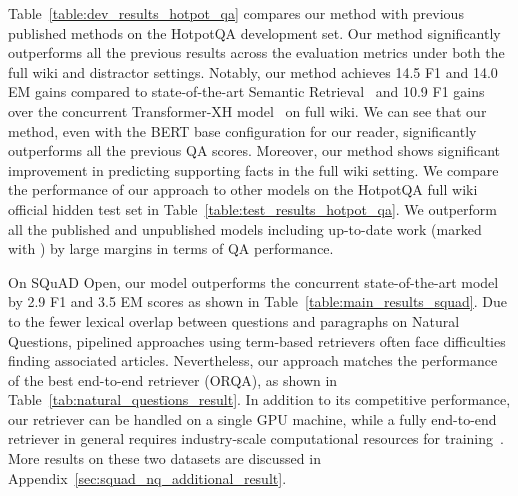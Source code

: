 \documentclass{article} \usepackage{iclr2020_conference,times}
\begin{document}
Table~\ref{table:dev_results_hotpot_qa} compares our method with previous published methods on the HotpotQA development set.
Our method significantly outperforms all the previous results across the evaluation metrics under both the full wiki and distractor settings. 
Notably, our method achieves 14.5 F1 and 14.0 EM gains compared to state-of-the-art Semantic Retrieval~\citep{nie_pip_2019} and 10.9 F1 gains over the concurrent Transformer-XH model~\citep{zhao2020transformerxh} on full wiki. 
We can see that our method, even with the BERT base configuration for our reader, significantly outperforms all the previous QA scores.
Moreover, our method shows significant improvement in predicting supporting facts in the full wiki setting.
We compare the performance of our approach to other models on the HotpotQA full wiki official hidden test set in Table~\ref{table:test_results_hotpot_qa}.
We outperform all the published and unpublished models including up-to-date work (marked with ) by large margins in terms of QA performance.

On SQuAD Open, our model outperforms the concurrent state-of-the-art model~\citep{multipassage-bert-2019} by 2.9 F1 and 3.5 EM scores as shown in Table~\ref{table:main_results_squad}. 
Due to the fewer lexical overlap between questions and paragraphs on Natural Questions, pipelined approaches using term-based retrievers often face difficulties finding associated articles.
Nevertheless, our approach matches the performance of the best end-to-end retriever (ORQA), as shown in Table~\ref{tab:natural_questions_result}.
In addition to its competitive performance, our retriever can be handled on a single GPU machine, while a fully end-to-end retriever in general  requires industry-scale computational resources for training~\citep{denspi}.
More results on these two datasets are discussed in Appendix~\ref{sec:squad_nq_additional_result}.
\end{document}
